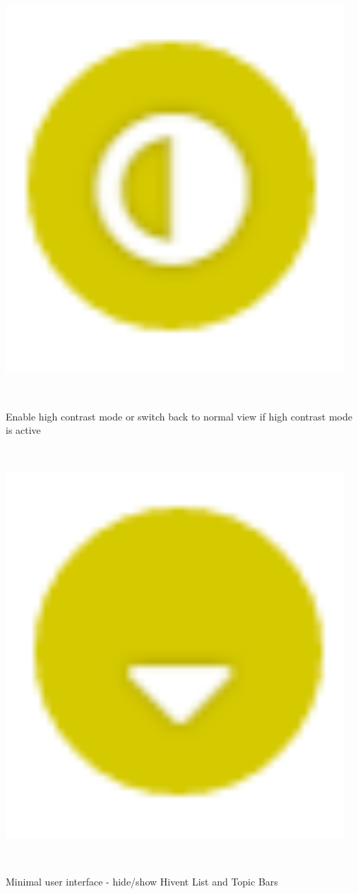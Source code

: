 \begin{minipage}{0.05\textwidth}
	\includegraphics[width=0.95\textwidth]{graphics/HC.png}
\end{minipage}
\label{fig:controll_button_HC}
~
\begin{minipage}{0.94\textwidth}
	Enable high contrast mode or switch back to normal view if high contrast mode is active\\
\end{minipage}
~
\begin{minipage}{0.05\textwidth}
	\includegraphics[width=0.95\textwidth]{graphics/minUi.png}
\end{minipage}
\label{fig:controll_button_HC}
~
\begin{minipage}{0.94\textwidth}
	Minimal user interface - hide/show Hivent List and Topic Bars
\end{minipage}
~
